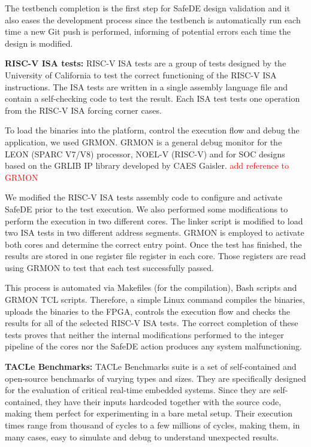 The testbench completion is the first step for SafeDE design validation and it also eases the development process since the testbench is automatically run each time a new Git push is performed, informing of potential errors each time the design is modified.



\textbf{RISC-V ISA tests:} RISC-V ISA tests \cite{ISAtests} are a group of tests designed by the University of California to test the correct functioning of the RISC-V ISA instructions. The ISA tests are written in a single assembly language file and contain a self-checking code to test the result. Each ISA test tests one operation from the RISC-V ISA forcing corner cases. 

To load the binaries into the platform, control the execution flow and debug the application, we used GRMON. GRMON is a general debug monitor for the LEON (SPARC V7/V8) processor, NOEL-V (RISC-V) and for SOC designs based on the GRLIB IP library developed by CAES Gaisler. 
\textcolor{red}{add reference to GRMON} 

We modified the RISC-V ISA tests assembly code to configure and activate SafeDE prior to the test execution. We also performed some modifications to perform the execution in two different cores. The linker script is modified to load two ISA tests in two different address segments. GRMON is employed to activate both cores and determine the correct entry point. Once the test has finished, the results are stored in one register file register in each core. Those registers are read using GRMON to test that each test successfully passed. 

This process is automated via Makefiles (for the compilation), Bash scripts and GRMON TCL scripts. Therefore, a simple Linux command compiles the binaries, uploads the binaries to the FPGA, controls the execution flow and checks the results for all of the selected RISC-V ISA tests. The correct completion of these tests proves that neither the internal modifications performed to the integer pipeline of the cores nor the SafeDE action produces any system malfunctioning.

\textbf{TACLe Benchmarks:} TACLe Benchmarks suite \cite{falk2016taclebench} is a set of self-contained and open-source benchmarks of varying types and sizes. They are specifically designed for the evaluation of critical real-time embedded systems. Since they are self-contained, they have their inputs hardcoded together with the source code, making them perfect for experimenting in a bare metal setup. Their execution times range from thousand of cycles to a few millions of cycles, making them, in many cases, easy to simulate and debug to understand unexpected results.

